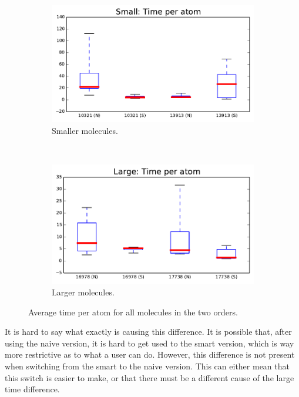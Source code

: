 \begin{figure}[h!]
\centering
\begin{subfigure}[t]{0.48\textwidth}
\centering
\includegraphics[width=\textwidth]{img/graphs/1c_03.pdf}
\caption{Smaller molecules.}
\end{subfigure}%
~
\begin{subfigure}[t]{0.48\textwidth}
\centering
\includegraphics[width=\textwidth]{img/graphs/1d_03.pdf}
\caption{Larger molecules.}
\end{subfigure}
\caption{Average time per atom for all molecules in the two orders.}
\end{figure}

It is hard to say what exactly is causing this difference. It is possible that, after using the naive version, it is hard to get used to the smart version, which is way more restrictive as to what a user can do. However, this difference is not present when switching from the smart to the naive version. This can either mean that this switch is easier to make, or that there must be a different cause of the large time difference.

